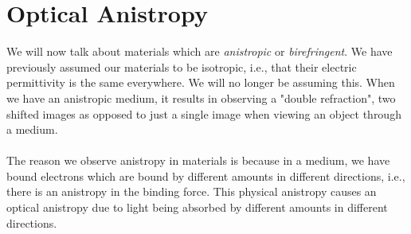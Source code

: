 \documentclass{book}
\begin{document}
{\section{Optical Anistropy}
We will now talk about materials which are \textit{anistropic} or \textit{birefringent}. We have previously assumed our materials to be isotropic, i.e., that their electric permittivity is the same everywhere. We will no longer be assuming this. When we have an anistropic medium, it results in observing a "double refraction", two shifted images as opposed to just a single image when viewing an object through a medium.
\\\\
The reason we observe anistropy in materials is because in a medium, we have bound electrons which are bound by different amounts in different directions, i.e., there is an anistropy in the binding force. This physical anistropy causes an optical anistropy due to light being absorbed by different amounts in different directions.
}
\end{document}
